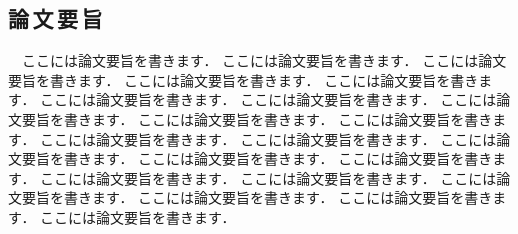 \begin{center}
\section*{論\,文\,要\,旨}                      %
\end{center}

　ここには論文要旨を書きます．
ここには論文要旨を書きます．
ここには論文要旨を書きます．
ここには論文要旨を書きます．
ここには論文要旨を書きます．
ここには論文要旨を書きます．
ここには論文要旨を書きます．
ここには論文要旨を書きます．
ここには論文要旨を書きます．
ここには論文要旨を書きます．
ここには論文要旨を書きます．
ここには論文要旨を書きます．
ここには論文要旨を書きます．
ここには論文要旨を書きます．
ここには論文要旨を書きます．
ここには論文要旨を書きます．
ここには論文要旨を書きます．
ここには論文要旨を書きます．
ここには論文要旨を書きます．
ここには論文要旨を書きます．
ここには論文要旨を書きます．
